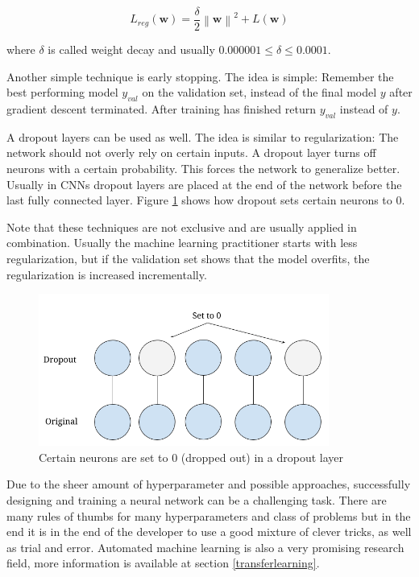 \documentclass[draft,final,oneside]{vutinfth} %
\newcommand{\norm}[1]{\left\lVert#1\right\rVert}
\begin{document}
\begin{equation}
L_{reg}(\boldsymbol{w}) = \dfrac{\delta}{2}\norm{\boldsymbol{w}}^2 + L(\boldsymbol{w})
\end{equation}

where $\delta$ is called weight decay and usually $0.000001 \leq \delta \leq 0.0001$.

Another simple technique is early stopping. The idea is simple: Remember the best performing model $y_{val}$ on the validation set, instead of the final model $y$ after gradient descent terminated. After training has finished return $y_{val}$ instead of $y$.

A dropout layers can be used as well. The idea is similar to regularization: The network should not overly rely on certain inputs. A dropout layer turns off neurons with a certain probability. This forces the network to generalize better. Usually in CNNs dropout layers are placed at the end of the network before the last fully connected layer. Figure \ref{fig:dropout} shows how dropout sets certain neurons to 0.

Note that these techniques are not exclusive and are usually applied in combination. Usually the machine learning practitioner starts with less regularization, but if the validation set shows that the model overfits, the regularization is increased incrementally.

\begin{figure}[ht]
	\centering
  	\includegraphics[width=0.85\textwidth]{graphics/dropout.png}
	\caption{Certain neurons are set to 0 (dropped out) in a dropout layer}
	\label{fig:dropout}
\end{figure}

Due to the sheer amount of hyperparameter and possible approaches, successfully designing and training a neural network can be a challenging task. There are many rules of thumbs for many hyperparameters and class of problems but in the end it is in the end of the developer to use a good mixture of clever tricks, as well as trial and error. Automated machine learning is also a very promising research field, more information is available at section \ref{transferlearning}.
\end{document}
